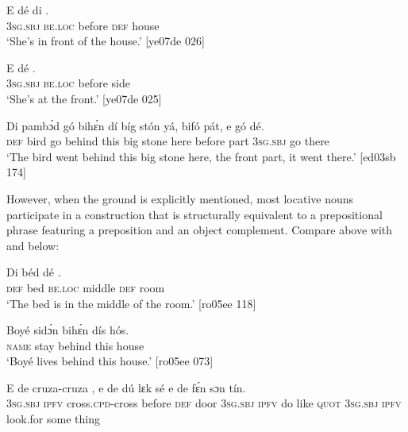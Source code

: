 \ea%
    \label{ex:key:917}
    \gll E    dé        di  .\\
\textsc{3sg.sbj}  \textsc{be.loc}  before  \textsc{def}  house\\

\glt ‘She’s in front of the house.’ [ye07de 026]
\z


\ea%
    \label{ex:key:918}
    \gll E    dé        .\\
\textsc{3sg.sbj}  \textsc{be.loc}  before  side\\

\glt ‘She’s at the front.’ [ye07de 025]
\z


\ea%
    \label{ex:key:919}
    \gll Di  pambɔ́d  gó  bihɛ́n  dí  bíg  stón    yá,    bifó    pát,
e    gó  dé.\\
\textsc{def}  bird    go  behind  this  big  stone  here    before  part
\textsc{3sg.sbj}  go  there\\

\glt ‘The bird went behind this big stone here, the front part, it went there.’ [ed03sb 174]
\z

However, when the ground is explicitly mentioned, most locative nouns participate in a construction that is structurally equivalent to a prepositional phrase featuring a preposition and an object complement. Compare  above with  and  below:


\ea%
    \label{ex:key:920}
    \gll Di  béd  dé        .\\
\textsc{def}  bed  \textsc{be.loc}  middle  \textsc{def}  room\\

\glt ‘The bed is in the middle of the room.’ [ro05ee 118]
\z


\ea%
    \label{ex:key:921}
    \gll Boyé  sidɔ́n  bihɛ́n  dís  hós.\\
\textsc{name}  stay    behind  this  house\\

\glt ‘Boyé lives behind this house.’ [ro05ee 073]
\z


\ea%
    \label{ex:key:922}
    \gll E    de  cruza-cruza          ,  e    de  dú
lɛk  sé    e    de  fɛ́n    sɔn    tín.\\
\textsc{3sg.sbj}  \textsc{ipfv}  cross.\textsc{cpd}{}-cross  before  \textsc{def}  door  \textsc{3sg.sbj}  \textsc{ipfv}  do
like  \textsc{quot}    \textsc{3sg.sbj}  \textsc{ipfv}  look.for  some  thing\\

